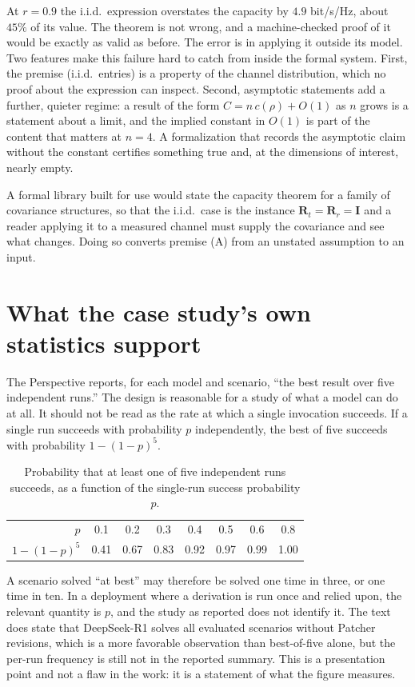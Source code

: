 \documentclass[11pt]{article}
\theoremstyle{definition}
\begin{document}
At $r=0.9$ the i.i.d.\ expression overstates the capacity by $4.9$ bit/s/Hz, about $45\%$ of its value. The theorem is not wrong, and a machine-checked proof of it would be exactly as valid as before. The error is in applying it outside its model. Two features make this failure hard to catch from inside the formal system. First, the premise (i.i.d.\ entries) is a property of the channel distribution, which no proof about the expression can inspect. Second, asymptotic statements add a further, quieter regime: a result of the form $C=n\,c(\rho)+O(1)$ as $n$ grows is a statement about a limit, and the implied constant in $O(1)$ is part of the content that matters at $n=4$. A formalization that records the asymptotic claim without the constant certifies something true and, at the dimensions of interest, nearly empty.

A formal library built for use would state the capacity theorem for a family of covariance structures, so that the i.i.d.\ case is the instance $\mathbf R_t=\mathbf R_r=\mathbf I$ and a reader applying it to a measured channel must supply the covariance and see what changes. Doing so converts premise (A) from an unstated assumption to an input.

\section{What the case study's own statistics support}
\label{sec:report}

The Perspective reports, for each model and scenario, ``the best result over five independent runs.'' The design is reasonable for a study of what a model can do at all. It should not be read as the rate at which a single invocation succeeds. If a single run succeeds with probability $p$ independently, the best of five succeeds with probability $1-(1-p)^5$.

\begin{table}[h]
\centering
\caption{Probability that at least one of five independent runs succeeds, as a function of the single-run success probability $p$.}
\label{tab:best}
\begin{tabular}{rccccccc}
\toprule
$p$ & 0.1 & 0.2 & 0.3 & 0.4 & 0.5 & 0.6 & 0.8 \\
$1-(1-p)^5$ & 0.41 & 0.67 & 0.83 & 0.92 & 0.97 & 0.99 & 1.00 \\
\bottomrule
\end{tabular}
\end{table}

A scenario solved ``at best'' may therefore be solved one time in three, or one time in ten. In a deployment where a derivation is run once and relied upon, the relevant quantity is $p$, and the study as reported does not identify it. The text does state that DeepSeek-R1 solves all evaluated scenarios without Patcher revisions, which is a more favorable observation than best-of-five alone, but the per-run frequency is still not in the reported summary. This is a presentation point and not a flaw in the work: it is a statement of what the figure measures.
\end{document}
